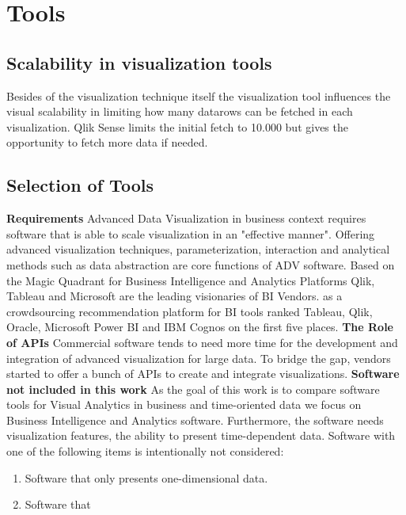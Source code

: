 \chapter{Tools}
\label{Tools}
\section{Scalability in visualization tools}
Besides of the visualization technique itself the visualization tool influences the visual scalability in limiting how many datarows can be fetched in each visualization. Qlik Sense limits the initial fetch to 10.000 but gives the opportunity to fetch more data if needed. 

\section{Selection of Tools}
\textbf{Requirements}
Advanced Data Visualization in business context requires software that is able to scale visualization in an "effective manner"\cite{Russom2011}. Offering advanced visualization techniques, parameterization, interaction and analytical methods such as data abstraction\cite{Tegarden1999,Aigner2011,Eick2002,Zhanga} are core functions of ADV software. Based on the Magic Quadrant for Business Intelligence and Analytics Platforms\cite{Parenteau2016} Qlik, Tableau and Microsoft are the leading visionaries of BI Vendors. \cite{ITCentralStation} as a crowdsourcing recommendation platform for BI tools ranked Tableau, Qlik, Oracle, Microsoft Power BI and IBM Cognos on the first five places.
\textbf{The Role of APIs}
Commercial software tends to need more time for the development and integration of advanced visualization for large data\cite{Zhanga, Simon2014}. To bridge the gap, vendors started to offer a bunch of APIs to create and integrate visualizations.
\textbf{Software not included in this work}
As the goal of this work is to compare software tools %
for Visual Analytics in business and time-oriented data we focus on Business Intelligence and Analytics software. Furthermore, the software needs visualization features, the ability to present time-dependent data. Software with one of the following items is intentionally not considered: 
\begin{enumerate}
    \item Software that only presents one-dimensional data. 
    \item Software that 
\end{enumerate}

